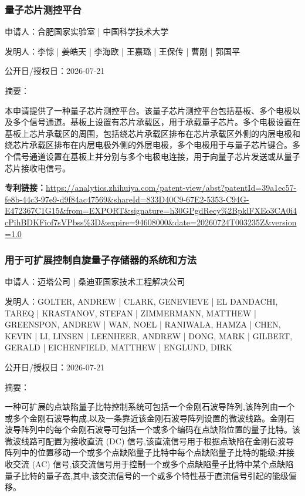 \documentclass[12pt,a4paper]{ctexart}
\begin{document}
\subsubsection{ 量子芯片测控平台 }

申请人：合肥国家实验室 | 中国科学技术大学

发明人：李悰 | 姜皓天 | 李海欧 | 王嘉璐 | 王保传 | 曹刚 | 郭国平

公开日/授权日：2026-07-21

摘要：

本申请提供了一种量子芯片测控平台。该量子芯片测控平台包括基板、多个电极以及多个信号通道。基板上设置有芯片承载区，用于承载量子芯片。多个电极设置在基板上芯片承载区的周围，包括绕芯片承载区排布在芯片承载区外侧的内层电极和绕芯片承载区排布在内层电极外侧的外层电极，多个电极用于与量子芯片键合。多个信号通道设置在基板上并分别与多个电极电连接，用于向量子芯片发送或从量子芯片接收电信号。

\noindent\textbf{专利链接：}\url{https://analytics.zhihuiya.com/patent-view/abst?patentId=39a1ec57-fe8b-44c3-97e9-d9f84ac47569&shareId=833D40C9-67E2-5353-C94G-E472367C1G15&from=EXPORT&signature=h30GPgdRecy%2BpklFXEo3CA0i4cPihBDKFiof7sVPbss%3D&expire=94608000&date=20260724T003235Z&version=1.0}

\subsubsection{ 用于可扩展控制自旋量子存储器的系统和方法 }

申请人：迈塔公司 | 桑迪亚国家技术工程解决公司

发明人：GOLTER, ANDREW | CLARK, GENEVIEVE | EL DANDACHI, TAREQ | KRASTANOV, STEFAN | ZIMMERMANN, MATTHEW | GREENSPON, ANDREW | WAN, NOEL | RANIWALA, HAMZA | CHEN, KEVIN | LI, LINSEN | LEENHEER, ANDREW | DONG, MARK | GILBERT, GERALD | EICHENFIELD, MATTHEW | ENGLUND, DIRK

公开日/授权日：2026-07-21

摘要：

一种可扩展的点缺陷量子比特控制系统可包括一个金刚石波导阵列,该阵列由一个或多个金刚石波导构成,以及一条靠近该金刚石波导阵列设置的微波线路。金刚石波导阵列中的每个金刚石波导可包括一个或多个编码在点缺陷位置的量子比特。该微波线路可配置为接收直流 (DC) 信号,该直流信号用于根据点缺陷在金刚石波导阵列中的位置移动一个或多个点缺陷量子比特中每个点缺陷量子比特的能级;并接收交流 (AC) 信号,该交流信号用于控制一个或多个点缺陷量子比特中某个点缺陷量子比特的量子态,其中,该交流信号的一个或多个特性基于直流信号引起的能级偏移。
\end{document}
